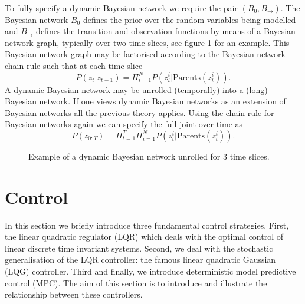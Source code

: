 To fully specify a dynamic Bayesian network we require the pair $(B_0, B_{\rightarrow})$. The Bayesian network $B_0$ defines the prior over the random variables being modelled and $B_{\rightarrow}$ defines the transition and observation functions by means of a Bayesian network graph, typically over two time slices, see figure \ref{fig_gen_dbn} for an example. This Bayesian network graph may be factorised according to the Bayesian network chain rule such that at each time slice
\begin{equation}
P(z_t|z_{t-1}) = \Pi_{i=1}^{N}P(z_t^i| \text{Parents} (z^i_t)).
\end{equation}
A dynamic Bayesian network may be unrolled (temporally) into a (long) Bayesian network. If one views dynamic Bayesian networks as an extension of Bayesian networks all the previous theory applies. Using the chain rule for Bayesian networks again we can specify the full joint over time as
\begin{equation}
P(z_{0:T}) = \Pi_{t=1}^{T}\Pi_{i=1}^{N}P(z_t^i| \text{Parents} (z^i_t)).
\end{equation}
\begin{figure}[H] 
\centering
{}
\caption{Example of a dynamic Bayesian network unrolled for 3 time slices.}
\label{fig_gen_dbn}
\end{figure}
\section{Control}
\label{sec_lit_control}
In this section we briefly introduce three fundamental control strategies. First, the linear quadratic regulator (LQR) which deals with the optimal control of linear discrete time invariant systems. Second, we deal with the stochastic generalisation of the LQR controller: the famous linear quadratic Gaussian (LQG) controller. Third and finally, we introduce deterministic model predictive control (MPC). The aim of this section is to introduce and illustrate the relationship between these controllers.

